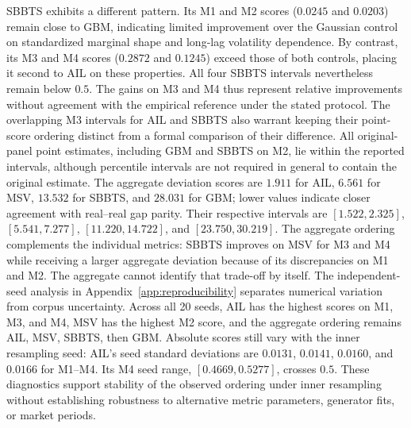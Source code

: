 {SBBTS exhibits a different pattern.
Its M1 and M2 scores ($0.0245$ and $0.0203$) remain close to GBM,
indicating limited improvement over the Gaussian control on standardized
marginal shape and long-lag volatility dependence.
By contrast, its M3 and M4 scores ($0.2872$ and $0.1245$) exceed those
of both controls, placing it second to AIL on these properties.
All four SBBTS intervals nevertheless remain below $0.5$.
The gains on M3 and M4 thus represent relative improvements without
agreement with the empirical reference under the stated protocol.
The overlapping M3 intervals for AIL and SBBTS also warrant keeping
their point-score ordering distinct from a formal comparison of
their difference.
All original-panel point estimates, including GBM and SBBTS on M2,
lie within the reported intervals, although percentile intervals
are not required in general to contain the original estimate.
The aggregate deviation scores are $1.911$ for AIL, $6.561$ for MSV,
$13.532$ for SBBTS, and $28.031$ for GBM; lower values indicate
closer agreement with real--real gap parity.
Their respective intervals are $[1.522,2.325]$, $[5.541,7.277]$,
$[11.220,14.722]$, and $[23.750,30.219]$.
The aggregate ordering complements the individual metrics:
SBBTS improves on MSV for M3 and M4 while receiving a larger
aggregate deviation because of its discrepancies on M1 and M2.
The aggregate cannot identify that trade-off by itself.
The independent-seed analysis in Appendix~\ref{app:reproducibility}
separates numerical variation from corpus uncertainty.
Across all 20 seeds, AIL has the highest scores on M1, M3, and M4,
MSV has the highest M2 score, and the aggregate ordering remains
AIL, MSV, SBBTS, then GBM.
Absolute scores still vary with the inner resampling seed:
AIL's seed standard deviations are $0.0131$, $0.0141$, $0.0160$,
and $0.0166$ for M1--M4.
Its M4 seed range, $[0.4669,0.5277]$, crosses $0.5$.
These diagnostics support stability of the observed ordering under
inner resampling without establishing robustness to alternative
metric parameters, generator fits, or market periods.
}

